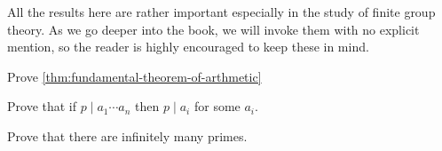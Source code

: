 \documentclass[./main.tex]{subfiles}
\begin{document}
All the results here are rather important especially in the study of finite
group theory. As we go deeper into the book, we will invoke them with no
explicit mention, so the reader is highly encouraged to keep these in mind.

\begin{exercise}
    Prove \cref{thm:fundamental-theorem-of-arthmetic}
\end{exercise}

\begin{exercise}
    Prove that if $p \mid a_1 \cdots a_n$ then $p \mid a_i$ for some
    $a_i$.
\end{exercise}

\begin{exercise}
    Prove that there are infinitely many primes.
\end{exercise}
\end{document}
